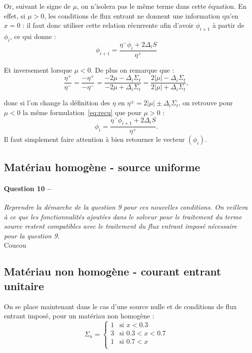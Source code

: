 \documentclass[11pt,a4paper]{article}
\newcommand{\question}[2]{\paragraph{Question #1 --}\hspace{-7pt}\textit{#2} \\}
\begin{document}
Or, suivant le signe de $\mu$, on n'isolera pas le même terme dans cette équation.
En effet, si $\mu>0$, les conditions de flux entrant ne donnent une information qu'en $x=0$ : il faut donc utiliser cette relation récurrente afin d'avoir $\phi_{i+1}$ à partir de $\phi_i$, ce qui donne :
\begin{equation}
 \phi_{i+1} = \frac{\eta^- \phi_i + 2 \Delta_i S}{\eta^+}
 \label{eq:recu}
\end{equation}

Et inversement lorsque $\mu<0$.
De plus on remarque que :
\begin{equation}
 \frac{\eta^+}{\eta^-} = \frac{- \eta^+}{-\eta^-} = \frac{-2 \mu - \Delta_i \Sigma_t}{-2 \mu + \Delta_i \Sigma_t} = \frac{2 |\mu| - \Delta_i \Sigma_t}{2 |\mu| + \Delta_i \Sigma_t} ,
\end{equation}

donc si l'on change la définition des $\eta$ en $\eta^{\pm} = 2|\mu| \pm \Delta_i \Sigma_t$, on retrouve pour $\mu<0$ la même formulation~\ref{eq:recu} que pour $\mu>0$ :
\begin{equation}
 \phi_i = \frac{\eta^- \phi_{i+1} + 2 \Delta_i S}{\eta^+} .
\end{equation}
Il faut simplement faire attention à bien retourner le vecteur $(\phi_i)$.

\subsection{Matériau homogène - source uniforme}

\question{10}{Reprendre la démarche de la question 9 pour ces nouvelles conditions. On veillera à ce que les fonctionnalités
 ajoutées dans le solveur pour le traitement du terme source restent compatibles avec le traitement du flux entrant imposé nécessaire pour la question 9.}
 Coucou
 \subsection{Matériau non homogène - courant entrant unitaire}
 
 On se place maintenant dans le cas d'une source nulle et de conditions de flux entrant imposé, pour un matériau non homogène :
\begin{equation}
  \Sigma_a =
  \begin{cases}
    1 &\mbox{si } x<0.3 \\
    3 &\mbox{si } 0.3<x<0.7 \\
    1 &\mbox{si } 0.7<x \\
  \end{cases}
\end{equation}
\end{document}
